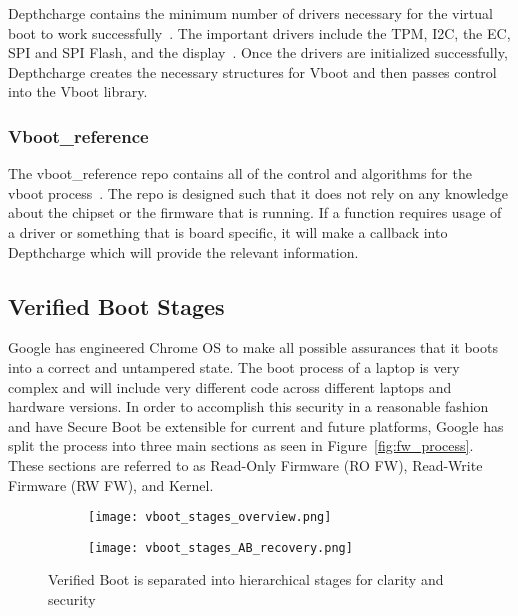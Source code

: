 \documentclass[../report.tex]{subfiles}
\begin{document}
Depthcharge contains the minimum number of drivers necessary for the virtual boot to work successfully~\cite{depthcharge-codebase}. 
The important drivers include the TPM, I2C, the EC, SPI and SPI Flash, and the display~\cite{depthcharge-slides}.
Once the drivers are initialized successfully, Depthcharge creates the necessary structures for Vboot and then passes control into the Vboot library.

\subsubsection{Vboot\_reference}

The vboot\_reference repo contains all of the control and algorithms for the vboot process~\cite{vboot-codebase}.
The repo is designed such that it does not rely on any knowledge about the chipset or the firmware that is running. 
If a function requires usage of a driver or something that is board specific, it will make a callback into Depthcharge which will provide the relevant information.

%


\subsection{Verified Boot Stages}

Google has engineered Chrome OS to make all possible assurances that it boots into a correct and untampered state. 
The boot process of a laptop is very complex and will include very different code across different laptops and hardware versions. 
In order to accomplish this security in a reasonable fashion and have Secure Boot be extensible for current and future platforms, Google has split the process into three main sections as seen in Figure~\ref{fig:fw_process}.
These sections are referred to as Read-Only Firmware (RO FW), Read-Write Firmware (RW FW), and Kernel.

\begin{figure}
\begin{subfigure}{.4\textwidth}
  \centering
  \texttt{[image: vboot\_stages\_overview.png]}
\end{subfigure}
\begin{subfigure}{.60\textwidth}
  \centering
  \texttt{[image: vboot\_stages\_AB\_recovery.png]}
\end{subfigure}
\caption{Verified Boot is separated into hierarchical stages for clarity and security}
\label{fig:vboot_stages_overview}
\end{figure}
\end{document}
